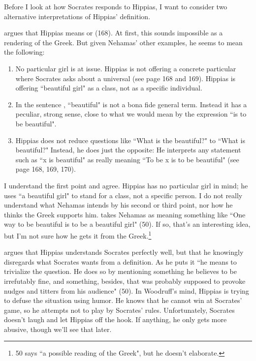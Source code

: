 \documentclass[11pt]{article}
\begin{document}
Before I look at how Socrates responds to Hippias, I want to consider two alternative interpretations of Hippias' definition.

\citet{nehamas1975a} argues that Hippias means  or  (168).  At first, this sounds impossible as a rendering of the Greek.  But given Nehamas' other examples, he seems to mean the following:

\begin{enumerate}
    \item No particular girl is at issue.  Hippias is not offering a concrete particular where Socrates asks about a universal (see page 168 and 169).  Hippias is offering ``beautiful girl" as a class, not as a specific individual.
    \item In the sentence , ``beautiful" is not a bona fide general term. Instead it has a peculiar, strong sense, close to what we would mean by the expression ``is to be beautiful".
    \item Hippias does not reduce questions like ``What is the beautiful?" to ``What is beautiful?"  Instead, he does just the opposite: He interprets any statement such as ``x is beautiful" as really meaning ``To be x is to be beautiful" (see page 168, 169, 170).
\end{enumerate}

I understand the first point and agree.  Hippias has no particular girl in mind; he uses ``a beautiful girl" to stand for a class, not a specific person. I do not really understand what Nehamas intends by his second or third point, nor how he thinks the Greek supports him.  \citet{woodruff1982} takes Nehamas as meaning something like ``One way to be beautiful is to be a beautiful girl" (50).  If so, that's an interesting idea, but I'm not sure how he gets it from the Greek.\footnote{\citet{woodruff1982} 50 says ``a possible reading of the Greek", but he doesn't elaborate.}

\citet{woodruff1982} argues that Hippias understands Socrates perfectly well, but that he knowingly disregards what Socrates wants from a definition.  As he puts it ``he means to trivialize the question.  He does so by mentioning something he believes to be irrefutably fine, and something, besides, that was probably supposed to provoke nudges and titters from his audience" (50).  In Woodruff's mind, Hippias is trying to defuse the situation using humor.  He knows that he cannot win at Socrates' game, so he attempts not to play by Socrates' rules.  Unfortunately, Socrates doesn't laugh and let Hippias off the hook.  If anything, he only gets more abusive, though we'll see that later.
\end{document}
